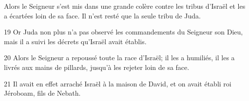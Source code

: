 Alors le Seigneur s’est mis dans une grande colère contre les tribus d’Israël et les a écartées loin de sa face. Il n’est resté que la seule tribu de Juda.

19 Or Juda non plus n’a pas observé les commandements du Seigneur son Dieu, mais il a suivi les décrets qu’Israël avait établis.

20 Alors le Seigneur a repoussé toute la race d’Israël; il les a humiliés, il les a livrés aux mains de pillards, jusqu’à les rejeter loin de sa face.

21 Il avait en effet arraché Israël à la maison de David, et on avait établi roi Jéroboam, fils de Nebath.